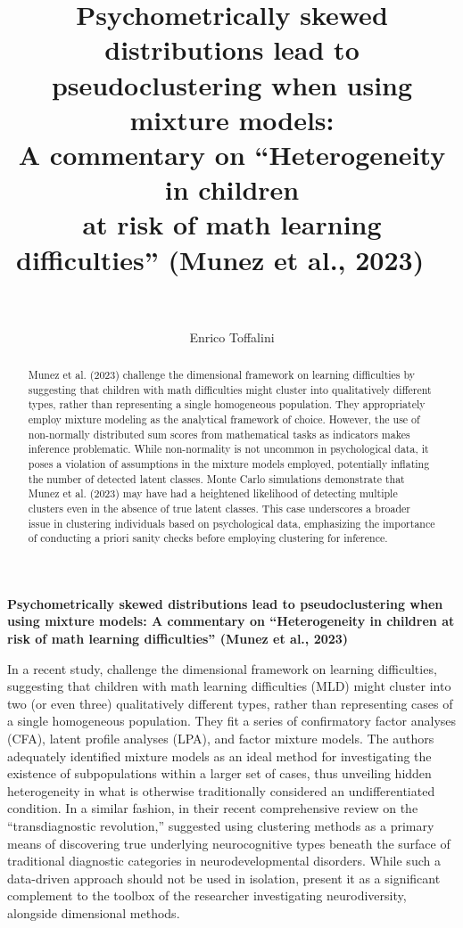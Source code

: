 \documentclass[letterpaper,11pt]{article}
\title{%
  \LARGE Psychometrically skewed distributions lead to pseudoclustering when using mixture models: \\ 
   \Large A commentary on “Heterogeneity in children \\ at risk of math learning difficulties” \large (Munez et al., 2023) 
  \ \\
  \ \\
}
\author{Enrico Toffalini}
\affil{Department of General Psychology, University of Padova, Italy}
\begin{document}
\maketitle
\newpage

\begin{abstract}
Munez et al. (2023) challenge the dimensional framework on learning difficulties by suggesting that children with math difficulties might cluster into qualitatively different types, rather than representing a single homogeneous population. They appropriately employ mixture modeling as the analytical framework of choice. However, the use of non-normally distributed sum scores from mathematical tasks as indicators makes inference problematic. While non-normality is not uncommon in psychological data, it poses a violation of assumptions in the mixture models employed, potentially inflating the number of detected latent classes. Monte Carlo simulations demonstrate that Munez et al. (2023) may have had a heightened likelihood of detecting multiple clusters even in the absence of true latent classes. This case underscores a broader issue in clustering individuals based on psychological data, emphasizing the importance of conducting a priori sanity checks before employing clustering for inference.
\end{abstract}

\newpage

\begin{center} 
\textbf{Psychometrically skewed distributions lead to pseudoclustering when using mixture models: A commentary on “Heterogeneity in children at risk of math learning difficulties” (Munez et al., 2023)}
\end{center}

In a recent study,  challenge the dimensional framework on learning difficulties, suggesting that children with math learning difficulties (MLD) might cluster into two (or even three) qualitatively different types, rather than representing cases of a single homogeneous population. They fit a series of confirmatory factor analyses (CFA), latent profile analyses (LPA), and factor mixture models. The authors adequately identified mixture models as an ideal method for investigating the existence of subpopulations within a larger set of cases, thus unveiling hidden heterogeneity in what is otherwise traditionally considered an undifferentiated condition. In a similar fashion, in their recent comprehensive review on the “transdiagnostic revolution,”  suggested using clustering methods as a primary means of discovering true underlying neurocognitive types beneath the surface of traditional diagnostic categories in neurodevelopmental disorders. While such a data-driven approach should not be used in isolation,  present it as a significant complement to the toolbox of the researcher investigating neurodiversity, alongside dimensional methods.
\end{document}
